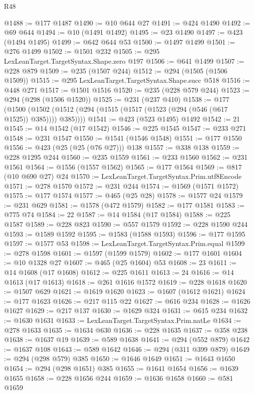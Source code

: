\begin{lexlean}{R48}
\begin{coremodule}
@1488 := @177 @1487
@1490 := @10 @644 @27
@1491 := @424 @1490
@1492 := @69 @644
@1494 := @10 (@1491 @1492)
@1495 := @23 @1490
@1497 := @423 (@1494 @1495)
@1499 := @642 @644 @53
@1500 := @1497 @1499
@1501 := @276 @1499
@1502 := @1501 @232
@1505 := @295 LexLeanTarget.TargetSyntax.Shape.zero @197
@1506 := @641 @1499
@1507 := @228 @879
@1509 := @235 (@1507 @244)
@1512 := @294 (@1505 (@1506 @1509))
@1515 := @295 LexLeanTarget.TargetSyntax.Shape.succ @518
@1516 := @448 @271
@1517 := @1501 @1516
@1520 := @235 (@228 @579 @244)
@1523 := @294 (@298 (@1506 @1520))
@1525 := @231 (@237 @410)
@1538 := @177
    (@1500 (@1502 (@1512 (@294 (@1515 (@1517 (@1523 (@294 (@546 (@617 @1525)) @385)))) @385))))
@1541 := @423 (@523 @1495) @1492
@1542 := 21
@1545 := @14 @1542 (@17 @1542)
@1546 := @225 @1545
@1547 := @233 @271
@1548 := @231 @1547
@1550 := @1541 (@1546 @1548)
@1551 := @177 @1550
@1556 := @423 (@25 (@25 (@76 @27))) @138
@1557 := @338 @138
@1559 := @228 @1295 @244
@1560 := @235 @1559
@1561 := @233 @1560
@1562 := @231 @1561
@1564 := @1556 (@1557 @1562)
@1565 := @177 @1564
@1569 := @817 (@10 @690 @27) @24
@1570 := LexLeanTarget.TargetSyntax.Prim.utf8Encode
@1571 := @278 @1570
@1572 := @231 @244
@1574 := @1569 (@1571 @1572)
@1575 := @177 @1574
@1577 := @465 (@25 @28)
@1578 := @1577 @24
@1579 := @231 @629
@1581 := @1578 (@472 @1579)
@1582 := @177 @1581
@1583 := @775 @74
@1584 := 22
@1587 := @14 @1584 (@17 @1584)
@1588 := @225 @1587
@1589 := @228 @823
@1590 := @557 @1579
@1592 := @228 @1590 @244
@1593 := @1589 @1592
@1595 := @1583 (@1588 @1593)
@1596 := @177 @1595
@1597 := @1577 @53
@1598 := LexLeanTarget.TargetSyntax.Prim.equal
@1599 := @278 @1598
@1601 := @1597 (@1599 @1579)
@1602 := @177 @1601
@1604 := @10 @1328 @27
@1607 := @465 (@25 @1604) @53
@1608 := 23
@1611 := @14 @1608 (@17 @1608)
@1612 := @225 @1611
@1613 := 24
@1616 := @14 @1613 (@17 @1613)
@1618 := @261 @1616 @1572
@1619 := @228 @1618
@1620 := @1507 @629
@1621 := @1619 @1620
@1623 := @1607 (@1612 @1621)
@1624 := @177 @1623
@1626 := @217 @115 @22
@1627 := @616 @234
@1628 := @1626 @1627
@1629 := @217 @137
@1630 := @1629 @324
@1631 := @615 @234
@1632 := @1630 @1631
@1633 := LexLeanTarget.TargetSyntax.Prim.natLe
@1634 := @278 @1633
@1635 := @1634 @630
@1636 := @228 @1635
@1637 := @358 @238
@1638 := @1637 @19
@1639 := @589 @1638
@1641 := @294 (@552 @879)
@1642 := @1637 @108
@1643 := @589 @1642
@1646 := @294 (@311 @399 @879)
@1649 := @294 (@298 @579) @385
@1650 := @1646 @1649
@1651 := @1643 @1650
@1654 := @294 (@298 @1651) @385
@1655 := @1641 @1654
@1656 := @1639 @1655
@1658 := @228 @1656 @244
@1659 := @1636 @1658
@1660 := @581 @1659

\end{coremodule}
\end{lexlean}

